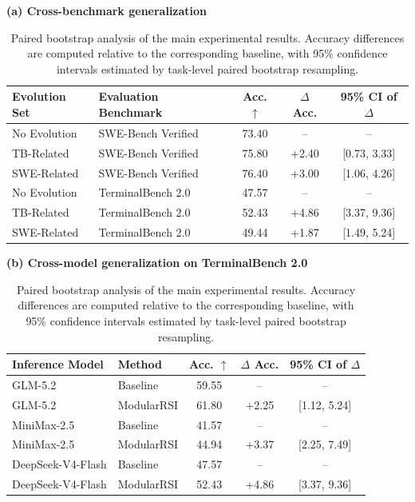 \documentclass{article} %
\begin{document}
\begin{table}[t]
\centering
\footnotesize
\setlength{\tabcolsep}{5pt}

\caption{Paired bootstrap analysis of the main experimental results. Accuracy differences are computed relative to the corresponding baseline, with 95\% confidence intervals estimated by task-level paired bootstrap resampling.}
\textbf{(a) Cross-benchmark generalization}

\vspace{2pt}

\begin{tabular}{llccc}
\toprule
\textbf{Evolution Set} &
\textbf{Evaluation Benchmark} &
\textbf{Acc. $\uparrow$} &
\textbf{$\Delta$ Acc.} &
\textbf{95\% CI of $\Delta$} \\
\midrule
No Evolution & SWE-Bench Verified & 73.40 & -- & -- \\
TB-Related   & SWE-Bench Verified & 75.80 & +2.40 & [0.73, 3.33] \\
SWE-Related  & SWE-Bench Verified & 76.40 & +3.00 & [1.06, 4.26] \\
\midrule
No Evolution & TerminalBench 2.0 & 47.57 & -- & -- \\
TB-Related   & TerminalBench 2.0 & 52.43 & +4.86 & [3.37, 9.36] \\
SWE-Related  & TerminalBench 2.0 & 49.44 & +1.87 & [1.49, 5.24] \\
\bottomrule
\end{tabular}

\vspace{8pt}

\textbf{(b) Cross-model generalization on TerminalBench 2.0}

\vspace{2pt}

\begin{tabular}{llccc}
\toprule
\textbf{Inference Model} &
\textbf{Method} &
\textbf{Acc. $\uparrow$} &
\textbf{$\Delta$ Acc.} &
\textbf{95\% CI of $\Delta$} \\
\midrule
GLM-5.2 & Baseline   & 59.55 & -- & -- \\
GLM-5.2 & ModularRSI & 61.80 & +2.25 & [1.12, 5.24] \\
\midrule
MiniMax-2.5 & Baseline   & 41.57 & -- & -- \\
MiniMax-2.5 & ModularRSI & 44.94 & +3.37 & [2.25, 7.49] \\
\midrule
DeepSeek-V4-Flash & Baseline   & 47.57 & -- & -- \\
DeepSeek-V4-Flash & ModularRSI & 52.43 & +4.86 & [3.37, 9.36] \\
\bottomrule
\end{tabular}


\end{table}
\end{document}
